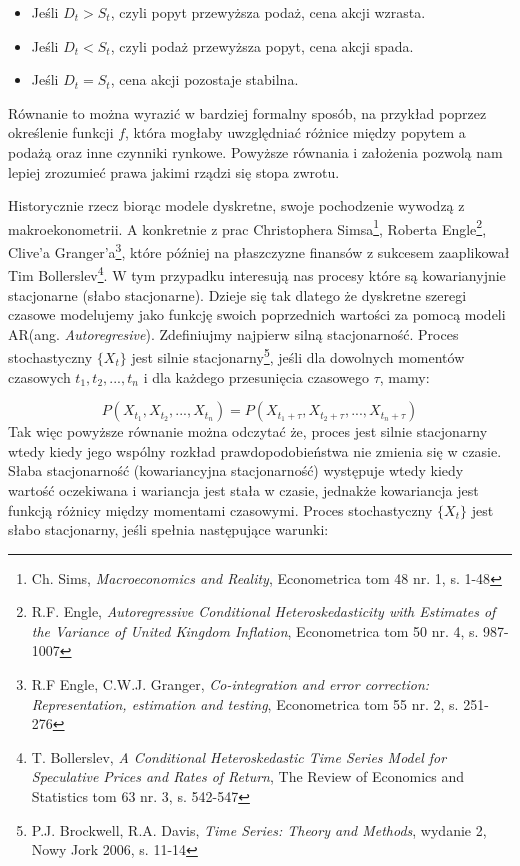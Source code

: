 \begin{itemize}
  \item Jeśli \( D_t > S_t \), czyli popyt przewyższa podaż, cena akcji wzrasta.
  \item Jeśli \( D_t < S_t \), czyli podaż przewyższa popyt, cena akcji spada.
  \item Jeśli \( D_t = S_t \), cena akcji pozostaje stabilna.
\end{itemize}
Równanie to można wyrazić w bardziej formalny sposób, na przykład poprzez określenie funkcji \( f \), która mogłaby uwzględniać różnice między popytem a podażą oraz inne czynniki rynkowe. Powyższe równania i założenia pozwolą nam lepiej zrozumieć prawa jakimi rządzi się stopa zwrotu.

Historycznie rzecz biorąc modele dyskretne, swoje pochodzenie wywodzą z makroekonometrii. A konkretnie z prac Christophera Simsa\footnote{Ch. Sims, \textit{Macroeconomics and Reality}, Econometrica tom 48 nr. 1, s. 1-48}, Roberta Engle\footnote{R.F. Engle, \textit{Autoregressive Conditional Heteroskedasticity with Estimates of the Variance of United Kingdom Inflation}, Econometrica tom 50 nr. 4, s. 987-1007}, Clive'a Granger'a\footnote{R.F Engle, C.W.J. Granger, \textit{Co-integration and error correction: Representation, estimation and testing}, Econometrica tom 55 nr. 2, s. 251-276}, które później na płaszczyzne finansów z sukcesem zaaplikował Tim Bollerslev\footnote{T. Bollerslev, \textit{A Conditional Heteroskedastic Time Series Model for Speculative Prices and Rates of Return}, The Review of Economics and Statistics tom 63 nr. 3, s. 542-547}. W tym przypadku interesują nas procesy które są kowarianyjnie stacjonarne (słabo stacjonarne). Dzieje się tak dlatego że dyskretne szeregi czasowe modelujemy jako funkcję swoich poprzednich wartości za pomocą modeli AR(ang. \textit{Autoregresive}). Zdefiniujmy najpierw silną stacjonarność. Proces stochastyczny \( \{X_t\} \) jest silnie stacjonarny\footnote{P.J. Brockwell, R.A. Davis, \textit{Time Series: Theory and Methods}, wydanie 2, Nowy Jork 2006, s. 11-14}, jeśli dla dowolnych momentów czasowych \( t_1, t_2, ..., t_n \) i dla każdego przesunięcia czasowego \( \tau \), mamy:

\begin{equation}
P(X_{t_1}, X_{t_2}, ..., X_{t_n}) = P(X_{t_1 + \tau}, X_{t_2 + \tau}, ..., X_{t_n + \tau})
\end{equation}
Tak więc powyższe równanie można odczytać że, proces jest silnie stacjonarny wtedy kiedy jego wspólny rozkład prawdopodobieństwa nie zmienia się w czasie. Słaba stacjonarność (kowariancyjna stacjonarność) występuje wtedy kiedy wartość oczekiwana i wariancja jest stała w czasie, jednakże kowariancja jest funkcją różnicy między momentami czasowymi. Proces stochastyczny \( \{X_t\} \) jest słabo stacjonarny, jeśli spełnia następujące warunki:

